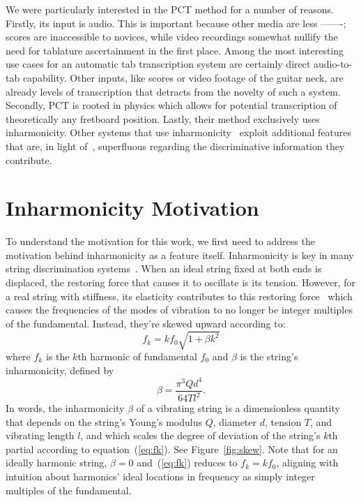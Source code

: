 \documentclass[12pt]{cmuthesis}
\begin{document}
We were particularly interested in the PCT method for a number of reasons. Firstly, its input is audio. This is important because other media are less -------; scores are inaccessible to novices, while video recordings somewhat nullify the need for tablature ascertainment in the first place. Among the most interesting use cases for an automatic tab transcription system are certainly direct audio-to-tab capability. Other inputs, like scores or video footage of the guitar neck, are already levels of transcription that detracts from the novelty of such a system. Secondly, PCT is rooted in physics which allows for potential transcription of theoretically any fretboard position. Lastly, their method exclusively uses inharmonicity. Other systems that use inharmonicity~\cite{barbancho2009,abesser2012,dittmar2013,kehling2014} exploit additional features that are, in light of~\cite{barbanchoi2012}, superfluous regarding the discriminative information they contribute. 

\section{Inharmonicity Motivation}
To understand the motivation for this work, we first need to address the motivation behind inharmonicity as a feature itself. Inharmonicity is key in many string discrimination systems~\cite{barbanchoi2012,abesser2012,dittmar2013,kehling2014}. When an ideal string fixed at both ends is displaced, the restoring force that causes it to oscillate is its tension. However, for a real string with stiffness, its elasticity contributes to this restoring force~\cite{fletcher1962} which causes the frequencies of the modes of vibration to no longer be integer multiples of the fundamental. Instead, they're skewed upward according to: 
\begin{equation}
\label{eq:fk}
f_k = kf_{0}\sqrt{1+\beta k^2}
\end{equation}
where $f_k$ is the $k$th harmonic of fundamental $f_0$ and $\beta$ is the string's inharmonicity, defined by
\begin{equation}
\beta = \frac{\pi^3 Q d^4}{64 T l^2}. \label{eq:beta}
\end{equation}
In words, the inharmonicity $\beta$ of a vibrating string is a dimensionless quantity that depends on the string's Young's modulus $Q$, diameter $d$, tension $T$, and vibrating length $l$, and which scales the degree of deviation of the string's $k$th partial according to equation~(\ref{eq:fk}). See Figure~\ref{fig:skew}. Note that for an ideally harmonic string, $\beta = 0$ and~(\ref{eq:fk}) reduces to $f_k = kf_0$, aligning with intuition about harmonics' ideal locations in frequency as simply integer multiples of the fundamental.
\end{document}
